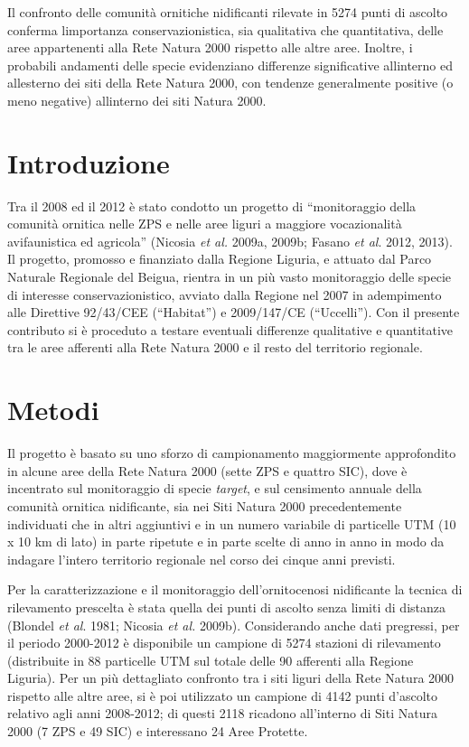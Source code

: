 Il confronto delle comunit\`a ornitiche nidificanti rilevate in 5274
punti di ascolto conferma l{\textquotesingle}importanza
conservazionistica, sia qualitativa che quantitativa, delle aree
appartenenti alla Rete Natura 2000 rispetto alle altre aree. Inoltre, i
probabili andamenti delle specie evidenziano differenze significative
all{\textquotesingle}interno ed all{\textquotesingle}esterno dei siti
della Rete Natura 2000, con tendenze generalmente positive (o meno
negative) all{\textquotesingle}interno dei siti Natura 2000. 



\section*{Introduzione}

Tra il 2008 ed il 2012 \`e stato condotto un progetto di
{\textquotedblleft}monitoraggio della comunit\`a ornitica nelle ZPS e
nelle aree liguri a maggiore vocazionalit\`a avifaunistica ed
agricola{\textquotedblright} (Nicosia \textit{et al. }2009a, 2009b;
Fasano \textit{et al}. 2012, 2013). Il progetto,  promosso e finanziato
dalla Regione Liguria, e attuato dal Parco Naturale Regionale del
Beigua, rientra in un pi\`u vasto monitoraggio delle specie di
interesse conservazionistico, avviato dalla Regione nel 2007 in
adempimento alle Direttive 92/43/CEE
({\textquotedblleft}Habitat{\textquotedblright}) e 2009/147/CE
({\textquotedblleft}Uccelli{\textquotedblright}). Con il presente
contributo si \`e proceduto a testare eventuali differenze qualitative
e quantitative tra le aree afferenti alla Rete Natura 2000 e il resto
del territorio regionale.

\section*{Metodi}
Il progetto \`e basato su uno sforzo di campionamento maggiormente
approfondito in alcune aree della Rete Natura 2000 (sette ZPS e quattro
SIC), dove \`e incentrato sul monitoraggio di specie \textit{target}, e
sul censimento annuale della comunit\`a ornitica nidificante, sia nei
Siti Natura 2000 precedentemente individuati che in altri aggiuntivi e
in un numero variabile di  particelle UTM  (10 x 10 km di lato) in
parte ripetute e in parte scelte di anno in anno in modo da indagare
l{\textquoteright}intero territorio regionale nel corso dei cinque anni
previsti.

Per la caratterizzazione e il monitoraggio
dell{\textquoteright}ornitocenosi nidificante la tecnica di rilevamento
prescelta \`e stata quella dei punti di ascolto senza limiti di
distanza (Blondel \textit{et al}. 1981; Nicosia \textit{et al.} 2009b).
Considerando anche dati pregressi, per il periodo 2000-2012 \`e
disponibile un campione di 5274 stazioni di rilevamento (distribuite in
88 particelle UTM sul totale delle 90 afferenti alla Regione Liguria).
Per un pi\`u dettagliato confronto tra i siti liguri della Rete Natura
2000 rispetto alle altre aree, si \`e poi utilizzato un campione di
4142 punti d{\textquoteright}ascolto relativo agli anni 2008-2012; di
questi 2118 ricadono all{\textquoteright}interno di Siti Natura 2000
(7 ZPS e 49 SIC) e interessano 24 Aree Protette.

